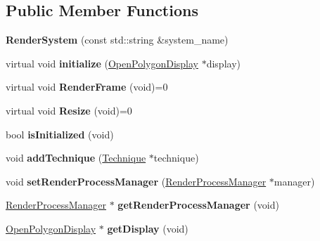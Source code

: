 \subsection*{Public Member Functions}
\begin{DoxyCompactItemize}
\item 
\hypertarget{classEngine_1_1RenderSystem_a053d7789d0341adb6598fc9a96fd0d65}{}{\bfseries Render\+System} (const std\+::string \&system\+\_\+name)\label{classEngine_1_1RenderSystem_a053d7789d0341adb6598fc9a96fd0d65}

\item 
\hypertarget{classEngine_1_1RenderSystem_ab469fe67089be47101aede4cd8bd921f}{}virtual void {\bfseries initialize} (\hyperlink{classEngine_1_1OpenPolygonDisplay}{Open\+Polygon\+Display} $\ast$display)\label{classEngine_1_1RenderSystem_ab469fe67089be47101aede4cd8bd921f}

\item 
\hypertarget{classEngine_1_1RenderSystem_a13f2af110456c3bc78e26a9ebaf1cf49}{}virtual void {\bfseries Render\+Frame} (void)=0\label{classEngine_1_1RenderSystem_a13f2af110456c3bc78e26a9ebaf1cf49}

\item 
\hypertarget{classEngine_1_1RenderSystem_a2606351d12604c0a4c0ae93b71914234}{}virtual void {\bfseries Resize} (void)=0\label{classEngine_1_1RenderSystem_a2606351d12604c0a4c0ae93b71914234}

\item 
\hypertarget{classEngine_1_1RenderSystem_a7ad5563108b0d0cf20136e6f1adf6505}{}bool {\bfseries is\+Initialized} (void)\label{classEngine_1_1RenderSystem_a7ad5563108b0d0cf20136e6f1adf6505}

\item 
\hypertarget{classEngine_1_1RenderSystem_a846943fe6a49f2c5a5263020f10e1c87}{}void {\bfseries add\+Technique} (\hyperlink{classEngine_1_1Technique}{Technique} $\ast$technique)\label{classEngine_1_1RenderSystem_a846943fe6a49f2c5a5263020f10e1c87}

\item 
\hypertarget{classEngine_1_1RenderSystem_afbbcc6ff7c42f703f2f5296e9b424dd5}{}void {\bfseries set\+Render\+Process\+Manager} (\hyperlink{classEngine_1_1RenderProcessManager}{Render\+Process\+Manager} $\ast$manager)\label{classEngine_1_1RenderSystem_afbbcc6ff7c42f703f2f5296e9b424dd5}

\item 
\hypertarget{classEngine_1_1RenderSystem_abc8659466eadafd5d86408734f9ced56}{}\hyperlink{classEngine_1_1RenderProcessManager}{Render\+Process\+Manager} $\ast$ {\bfseries get\+Render\+Process\+Manager} (void)\label{classEngine_1_1RenderSystem_abc8659466eadafd5d86408734f9ced56}

\item 
\hypertarget{classEngine_1_1RenderSystem_ac20e2eac202e428d88b700ac25c4bdd5}{}\hyperlink{classEngine_1_1OpenPolygonDisplay}{Open\+Polygon\+Display} $\ast$ {\bfseries get\+Display} (void)\label{classEngine_1_1RenderSystem_ac20e2eac202e428d88b700ac25c4bdd5}

\end{DoxyCompactItemize}
